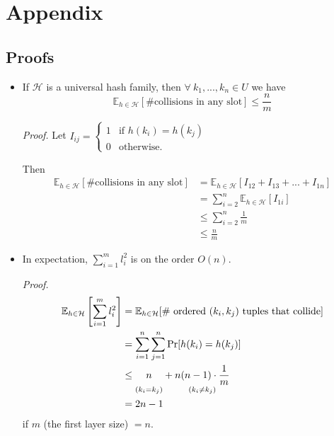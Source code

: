 \documentclass[11pt]{article}
\begin{document}
\section*{Appendix}

\subsection*{Proofs}

\begin{itemize}
\item If $\mathcal{H}$ is a universal hash family, then $\forall\ k_1, ..., k_n \in U$ we have
$$\mathbb{E}_{h \in \mathcal{H}}[\text{\# collisions in any slot}] \leq \frac{n}{m}$$

\textit{Proof.} Let $I_{ij} =
\begin{cases}
1 & \text{if $h(k_i) = h(k_j)$} \\
0 & \text{otherwise.}
\end{cases}$

Then
\begin{align*}
\mathbb{E}_{h \in \mathcal{H}}[\text{\# collisions in any slot}] &= \mathbb{E}_{h \in \mathcal{H}}[I_{12} + I_{13} + ... + I_{1n}] \\
&= \sum_{i = 2}^n \mathbb{E}_{h \in \mathcal{H}}[I_{1i}] \\
&\leq \sum_{i = 2}^n \frac{1}{m} \\
&\leq \frac{n}{m}
\end{align*}

\item In expectation, $\sum_{i = 1}^m l_i^2$ is on the order $O(n)$.

\textit{Proof.}
\begin{align*}
\mathbb{E}_{h \in \mathcal{H}}\left[\sum_{i = 1}^m l_i^2\right] &= \mathbb{E}_{h \in \mathcal{H}}[\text{\# ordered $(k_i, k_j)$ tuples that collide}] \\
&= \sum_{i = 1}^n \sum_{j = 1}^n \Pr[h(k_i) = h(k_j)] \\
&\leq {\underset{(k_i = k_j)}{n\vphantom{\frac{1}{m}}}} + {\underset{(k_i \neq k_j)}{n(n - 1) \cdot \frac{1}{m}}} \\
&= 2n - 1
\end{align*}
if $m$ (the first layer size) $= n$.
\end{itemize}
\end{document}
